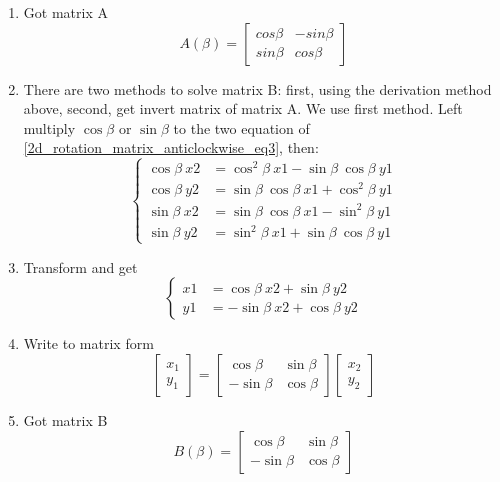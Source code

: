 \documentclass{article} %
\numberwithin{equation}{section} %
\begin{document}
\begin{enumerate}
\item Got matrix A
\begin{equation}\label{2d_rotation_matrix_anticlockwise_old_to_new}
A(\beta)=\begin{bmatrix}cos\beta & -sin\beta \\sin\beta & cos\beta \end{bmatrix}
\end{equation}

\item There are two methods to solve matrix B: 
first, using the derivation method above, second, get invert matrix of matrix A.
We use first method.
Left multiply $\cos\beta$ or $\sin\beta$ to the two equation of \eqref{2d_rotation_matrix_anticlockwise_eq3}, then:
\begin{equation}\label{2d_rotation_matrix_anticlockwise_eq4}
\left\{\begin{array}{rl}
\cos\beta~x2 &= \cos^2\beta~x1 - \sin\beta~\cos\beta~y1\\
\cos\beta~y2 &= \sin\beta~\cos\beta~x1 + \cos^2\beta~y1\\
\sin\beta~x2 &= \sin\beta~\cos\beta~x1 - \sin^2\beta~y1\\
\sin\beta~y2 &= \sin^2\beta~x1 + \sin\beta~\cos\beta~y1
\end{array}\right.
\end{equation}

\item Transform and get
\begin{equation}\label{2d_rotation_matrix_anticlockwise_eq6}
\left\{\begin{array}{rl}
x1 &= \cos\beta~x2 + \sin\beta~y2\\
y1 &= -\sin\beta~x2 + \cos\beta~y2
\end{array}\right.
\end{equation}

\item Write to matrix form
\begin{equation*}
\begin{bmatrix}x_1\\y_1\end{bmatrix}=
\begin{bmatrix}\cos\beta & \sin\beta \\-\sin\beta & \cos\beta \end{bmatrix}
\begin{bmatrix}x_2\\y_2\end{bmatrix}
\end{equation*}

\item Got matrix B
\begin{equation}\label{2d_rotation_matrix_anticlockwise_new_to_old}
B(\beta)=\begin{bmatrix}\cos\beta & \sin\beta \\-\sin\beta & \cos\beta \end{bmatrix}
\end{equation}

\end{enumerate}
\end{document}

